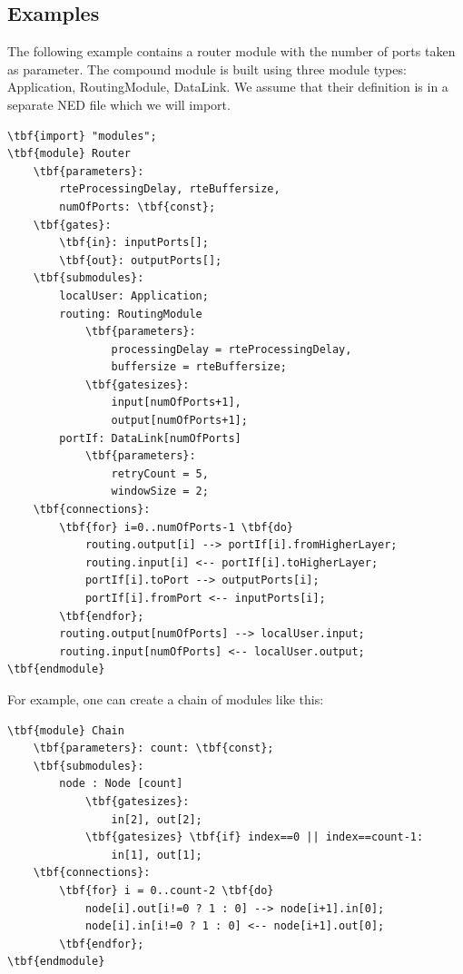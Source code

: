 \subsection{Examples}


The following example contains a router module with the number of
ports taken as parameter. The compound module is built using three
module types: Application, RoutingModule, DataLink. We assume that
their definition is in a separate NED file which we will import.


\begin{Verbatim}[commandchars=\\\{\}]
\tbf{import} "modules";
\tbf{module} Router
    \tbf{parameters}:
        rteProcessingDelay, rteBuffersize,
        numOfPorts: \tbf{const};
    \tbf{gates}:
        \tbf{in}: inputPorts[];
        \tbf{out}: outputPorts[];
    \tbf{submodules}:
        localUser: Application;
        routing: RoutingModule
            \tbf{parameters}:
                processingDelay = rteProcessingDelay,
                buffersize = rteBuffersize;
            \tbf{gatesizes}:
                input[numOfPorts+1],
                output[numOfPorts+1];
        portIf: DataLink[numOfPorts]
            \tbf{parameters}:
                retryCount = 5,
                windowSize = 2;
    \tbf{connections}:
        \tbf{for} i=0..numOfPorts-1 \tbf{do}
            routing.output[i] --> portIf[i].fromHigherLayer;
            routing.input[i] <-- portIf[i].toHigherLayer;
            portIf[i].toPort --> outputPorts[i];
            portIf[i].fromPort <-- inputPorts[i];
        \tbf{endfor};
        routing.output[numOfPorts] --> localUser.input;
        routing.input[numOfPorts] <-- localUser.output;
\tbf{endmodule}
\end{Verbatim}




For example, one can create a chain of modules like this:


\begin{Verbatim}[commandchars=\\\{\}]
\tbf{module} Chain
    \tbf{parameters}: count: \tbf{const};
    \tbf{submodules}:
        node : Node [count]
            \tbf{gatesizes}:
                in[2], out[2];
            \tbf{gatesizes} \tbf{if} index==0 || index==count-1:
                in[1], out[1];
    \tbf{connections}:
        \tbf{for} i = 0..count-2 \tbf{do}
            node[i].out[i!=0 ? 1 : 0] --> node[i+1].in[0];
            node[i].in[i!=0 ? 1 : 0] <-- node[i+1].out[0];
        \tbf{endfor};
\tbf{endmodule}
\end{Verbatim}


